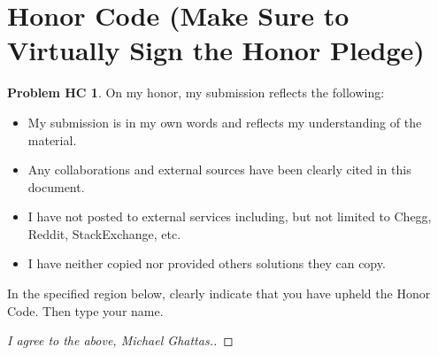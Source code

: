 \documentclass[11pt]{article}
\theoremstyle{definition}
\theoremstyle{definition}
\newtheorem*{requiredHC}{Problem HC}
\theoremstyle{definition}
\begin{document}
\section*{Honor Code (Make Sure to Virtually Sign the Honor Pledge)} 
\hypertarget{HonorCode}{}

\begin{requiredHC}
On my honor, my submission reflects the following:
\begin{itemize}
\item My submission is in my own words and reflects my understanding of the material.
\item Any collaborations and external sources have been clearly cited in this document.
\item I have not posted to external services including, but not limited to Chegg, Reddit, StackExchange, etc.
\item I have neither copied nor provided others solutions they can copy.
\end{itemize}

\noindent In the specified region below, clearly indicate that you have upheld the Honor Code. Then type your name. 
\end{requiredHC}

\begin{proof}[I agree to the above, Michael Ghattas.]
\end{proof}


\newpage
\end{document}
